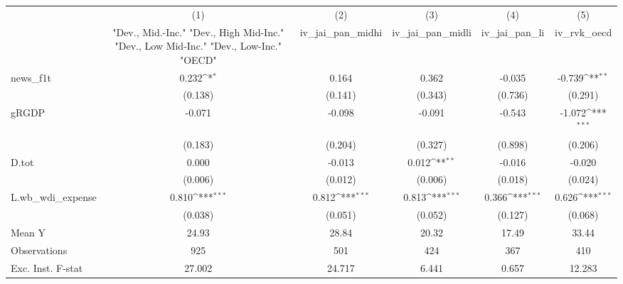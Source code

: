 {
\def\sym#1{\ifmmode^{#1}\else\(^{#1}\)\fi}
\begin{tabular}{l*{5}{c}}
\toprule
            &\multicolumn{1}{c}{(1)}&\multicolumn{1}{c}{(2)}&\multicolumn{1}{c}{(3)}&\multicolumn{1}{c}{(4)}&\multicolumn{1}{c}{(5)}\\
            &\multicolumn{1}{c}{ "Dev., Mid.-Inc." "Dev., High Mid-Inc." "Dev., Low Mid-Inc." "Dev., Low-Inc." "OECD" }&\multicolumn{1}{c}{iv\_jai\_pan\_midhi}&\multicolumn{1}{c}{iv\_jai\_pan\_midli}&\multicolumn{1}{c}{iv\_jai\_pan\_li}&\multicolumn{1}{c}{iv\_rvk\_oecd}\\
\midrule
news\_f1t    &       0.232\sym{*}  &       0.164         &       0.362         &      -0.035         &      -0.739\sym{**} \\
            &     (0.138)         &     (0.141)         &     (0.343)         &     (0.736)         &     (0.291)         \\
\addlinespace
gRGDP       &      -0.071         &      -0.098         &      -0.091         &      -0.543         &      -1.072\sym{***}\\
            &     (0.183)         &     (0.204)         &     (0.327)         &     (0.898)         &     (0.206)         \\
\addlinespace
D.tot       &       0.000         &      -0.013         &       0.012\sym{**} &      -0.016         &      -0.020         \\
            &     (0.006)         &     (0.012)         &     (0.006)         &     (0.018)         &     (0.024)         \\
\addlinespace
L.wb\_wdi\_expense&       0.810\sym{***}&       0.812\sym{***}&       0.813\sym{***}&       0.366\sym{***}&       0.626\sym{***}\\
            &     (0.038)         &     (0.051)         &     (0.052)         &     (0.127)         &     (0.068)         \\
\midrule
Mean Y      &       24.93         &       28.84         &       20.32         &       17.49         &       33.44         \\
Observations&         925         &         501         &         424         &         367         &         410         \\
Exc. Inst. F-stat&      27.002         &      24.717         &       6.441         &       0.657         &      12.283         \\
\bottomrule
\end{tabular}
}
